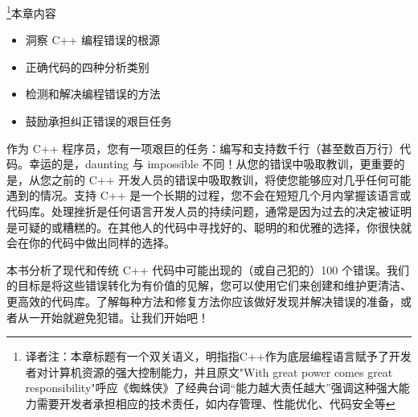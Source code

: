 
\footnote{译者注：本章标题有一个双关语义，明指指C++作为底层编程语言赋予了开发者对计算机资源的强大控制能力，并且原文"With great power comes great responsibility"呼应《蜘蛛侠》了经典台词“能力越大责任越大”强调这种强大能力需要开发者承担相应的技术责任，如内存管理、性能优化、代码安全等}本章内容

\begin{itemize}
\item
洞察 C++ 编程错误的根源

\item
正确代码的四种分析类别

\item
检测和解决编程错误的方法

\item
鼓励承担纠正错误的艰巨任务
\end{itemize}

作为 C++ 程序员，您有一项艰巨的任务：编写和支持数千行（甚至数百万行）代码。幸运的是，daunting 与 impossible 不同！从您的错误中吸取教训，更重要的是，从您之前的 C++ 开发人员的错误中吸取教训，将使您能够应对几乎任何可能遇到的情况。支持 C++ 是一个长期的过程，您不会在短短几个月内掌握该语言或代码库。处理挫折是任何语言开发人员的持续问题，通常是因为过去的决定被证明是可疑的或糟糕的。在其他人的代码中寻找好的、聪明的和优雅的选择，你很快就会在你的代码中做出同样的选择。

本书分析了现代和传统 C++ 代码中可能出现的（或自己犯的）100 个错误。我们的目标是将这些错误转化为有价值的见解，您可以使用它们来创建和维护更清洁、更高效的代码库。了解每种方法和修复方法你应该做好发现并解决错误的准备，或者从一开始就避免犯错。让我们开始吧！
